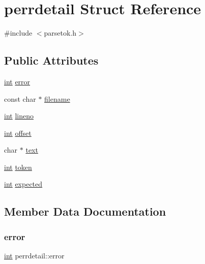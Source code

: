 \hypertarget{structperrdetail}{}\section{perrdetail Struct Reference}
\label{structperrdetail}


{\ttfamily \#include $<$parsetok.\+h$>$}

\subsection*{Public Attributes}
\begin{DoxyCompactItemize}
\item 
\mbox{\hyperlink{warnings_8h_a74f207b5aa4ba51c3a2ad59b219a423b}{int}} \mbox{\hyperlink{structperrdetail_ab80f68a217bb2600e8b52959696f1f3d}{error}}
\item 
const char $\ast$ \mbox{\hyperlink{structperrdetail_a15788384b9abb7088a9ab25e9223caed}{filename}}
\item 
\mbox{\hyperlink{warnings_8h_a74f207b5aa4ba51c3a2ad59b219a423b}{int}} \mbox{\hyperlink{structperrdetail_aca39ca397cdfe195a49eabf79010262a}{lineno}}
\item 
\mbox{\hyperlink{warnings_8h_a74f207b5aa4ba51c3a2ad59b219a423b}{int}} \mbox{\hyperlink{structperrdetail_acb64a7271e6ebe6c57791b152bbfed19}{offset}}
\item 
char $\ast$ \mbox{\hyperlink{structperrdetail_a02597d5aafb6886943176ce749f77e1c}{text}}
\item 
\mbox{\hyperlink{warnings_8h_a74f207b5aa4ba51c3a2ad59b219a423b}{int}} \mbox{\hyperlink{structperrdetail_a37c1a341622c0f1e2d3d6968d1008472}{token}}
\item 
\mbox{\hyperlink{warnings_8h_a74f207b5aa4ba51c3a2ad59b219a423b}{int}} \mbox{\hyperlink{structperrdetail_a93f70b9ef5490df737d24e47fb99716e}{expected}}
\end{DoxyCompactItemize}


\subsection{Member Data Documentation}
\mbox{\label{structperrdetail_ab80f68a217bb2600e8b52959696f1f3d}} 
\subsubsection{\texorpdfstring{error}{error}}
{\footnotesize\ttfamily \mbox{\hyperlink{warnings_8h_a74f207b5aa4ba51c3a2ad59b219a423b}{int}} perrdetail\+::error}

